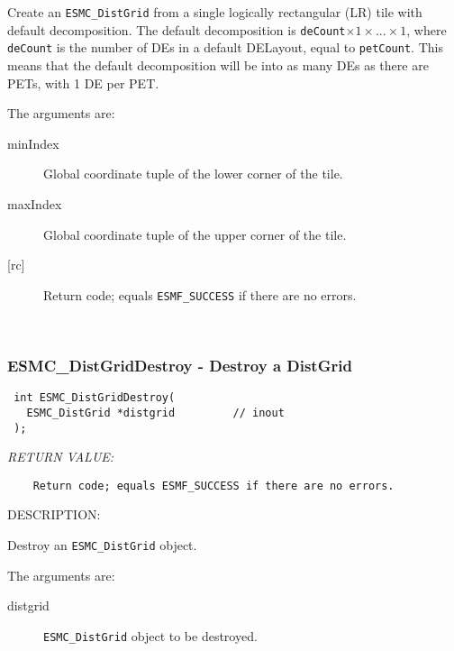     Create an {\tt ESMC\_DistGrid} from a single logically rectangular (LR) 
    tile with default decomposition. The default decomposition is 
    {\tt deCount}$ \times 1 \times ... \times 1$, where {\tt deCount} is the
    number of DEs in a default DELayout, equal to {\tt petCount}. This means
    that the default decomposition will be into as many DEs as there are PETs,
    with 1 DE per PET.
  
    The arguments are:
    \begin{description}
    \item[minIndex]
      Global coordinate tuple of the lower corner of the tile.
    \item[maxIndex]
      Global coordinate tuple of the upper corner of the tile.
    \item[{[rc]}]
      Return code; equals {\tt ESMF\_SUCCESS} if there are no errors.
    \end{description}
   
 
\mbox{}\hrulefill\ 
 
\subsubsection [ESMC\_DistGridDestroy] {ESMC\_DistGridDestroy - Destroy a DistGrid}


  
\begin{verbatim} int ESMC_DistGridDestroy(
   ESMC_DistGrid *distgrid         // inout
 );\end{verbatim}{\em RETURN VALUE:}
\begin{verbatim}    Return code; equals ESMF_SUCCESS if there are no errors.\end{verbatim}
{\sf DESCRIPTION:\\ }


  
    Destroy an {\tt ESMC\_DistGrid} object.
  
    The arguments are:
    \begin{description}
    \item[distgrid] 
      {\tt ESMC\_DistGrid} object to be destroyed.
    \end{description}
   
 
\mbox{}\hrulefill\ 
 
